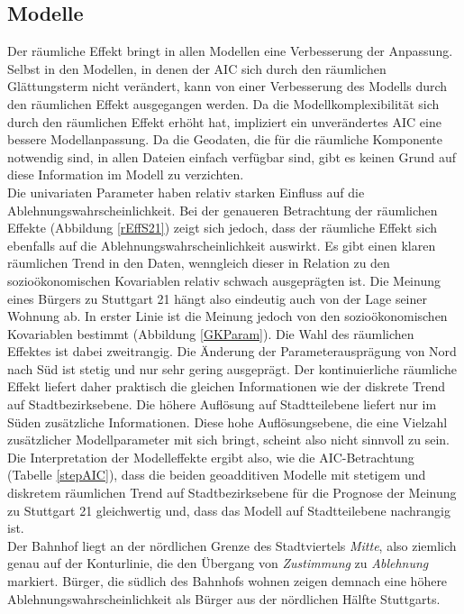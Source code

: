 \documentclass{Vorlage}
\begin{document}
\subsection{Modelle}
Der räumliche Effekt bringt in allen Modellen eine Verbesserung der Anpassung. Selbst in den Modellen, in denen der AIC sich durch den räumlichen Glättungsterm nicht verändert, kann von einer Verbesserung des Modells durch den räumlichen Effekt ausgegangen werden. Da die Modellkomplexibilität sich durch den räumlichen Effekt erhöht hat, impliziert ein unverändertes AIC eine bessere Modellanpassung. Da die Geodaten, die für die räumliche Komponente notwendig sind, in allen Dateien einfach verfügbar sind, gibt es keinen Grund auf diese Information im Modell zu verzichten.\\
Die univariaten Parameter haben relativ starken Einfluss auf die Ablehnungswahrscheinlichkeit. Bei der genaueren Betrachtung der räumlichen Effekte (Abbildung \ref{rEffS21}) zeigt sich jedoch, dass der räumliche Effekt sich ebenfalls auf die Ablehnungswahrscheinlichkeit auswirkt. Es gibt einen klaren räumlichen Trend in den Daten, wenngleich dieser in Relation zu den sozioökonomischen Kovariablen relativ schwach ausgeprägten ist. Die Meinung eines Bürgers zu Stuttgart 21 hängt also eindeutig auch von der Lage seiner Wohnung ab. In erster Linie ist die Meinung jedoch von den sozioökonomischen Kovariablen bestimmt (Abbildung \ref{GKParam}). Die Wahl des räumlichen Effektes ist dabei zweitrangig. Die Änderung der Parameterausprägung von Nord nach Süd ist stetig und nur sehr gering ausgeprägt. Der kontinuierliche räumliche Effekt liefert daher praktisch die gleichen Informationen wie der diskrete Trend auf Stadtbezirksebene. Die höhere Auflösung auf Stadtteilebene liefert nur im Süden zusätzliche Informationen. Diese hohe Auflösungsebene, die eine Vielzahl zusätzlicher Modellparameter mit sich bringt, scheint also nicht sinnvoll zu sein. Die Interpretation der Modelleffekte ergibt also, wie die AIC-Betrachtung (Tabelle \ref{stepAIC}), dass die beiden geoadditiven Modelle mit stetigem und diskretem räumlichen Trend auf Stadtbezirksebene für die Prognose der Meinung zu Stuttgart 21 gleichwertig und, dass das Modell auf Stadtteilebene nachrangig ist.\\
Der Bahnhof liegt an der nördlichen Grenze des Stadtviertels \textit{Mitte}, also ziemlich genau auf der Konturlinie, die den Übergang von \textit{Zustimmung} zu \textit{Ablehnung} markiert. Bürger, die südlich des Bahnhofs wohnen zeigen demnach eine höhere Ablehnungswahrscheinlichkeit als Bürger aus der nördlichen Hälfte Stuttgarts.\\
\end{document}
